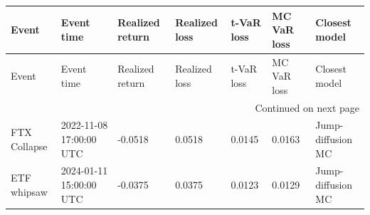 \begingroup
\scriptsize
\setlength{\tabcolsep}{3pt}
\begin{longtable}{@{}lllllll@{}}
\toprule
Event & Event time & Realized return & Realized loss & t-VaR loss & MC VaR loss & Closest model \\
\midrule
\endfirsthead
\toprule
Event & Event time & Realized return & Realized loss & t-VaR loss & MC VaR loss & Closest model \\
\midrule
\endhead
\midrule
\multicolumn{7}{r}{Continued on next page} \\
\midrule
\endfoot
\bottomrule
\endlastfoot
FTX Collapse & 2022-11-08 17:00:00 UTC & -0.0518 & 0.0518 & 0.0145 & 0.0163 & Jump-diffusion MC \\
ETF whipsaw & 2024-01-11 15:00:00 UTC & -0.0375 & 0.0375 & 0.0123 & 0.0129 & Jump-diffusion MC \\
\end{longtable}
\endgroup
